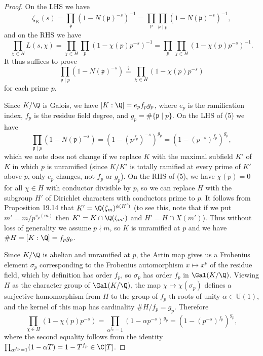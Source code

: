 \begin{proof}
On the LHS we have
\[
\zeta_K(s)=\prod_{\mathfrak p}(1-N(\mathfrak p)^{-s})^{-1}
=\prod_p\prod_{\mathfrak p\mid p}(1-N(\mathfrak p)^{-s})^{-1},
\]
and on the RHS we have
\[
\prod_{\chi\in H}L(s,\chi)=\prod_{\chi\in H}\prod_p(1-\chi(p)p^{-s})^{-1}
=\prod_p\prod_{\chi\in H}(1-\chi(p)p^{-s})^{-1}.
\]
It thus suffices to prove
\[
\prod_{\mathfrak p\mid p}(1-N(\mathfrak p)^{-s})\stackrel{?}{=}\prod_{\chi\in H}(1-\chi(p)p^{-s})\tag{5}
\]
for each prime $p$.

Since $K/\Q$ is Galois, we have $[K:\Q]=e_pf_pg_p$, where $e_p$ is the ramification index, $f_p$ is the residue field degree, and $g_p=\#\{\mathfrak p\mid p\}$. On the LHS of (5) we have
\[
\prod_{\mathfrak p\mid p}(1-N(\mathfrak p)^{-s})=(1-(p^{f_p})^{-s})^{g_p}=(1-(p^{-s})^{f_p})^{g_p},
\]
which we note does not change if we replace $K$ with the maximal subfield $K'$ of $K$ in which $p$ is unramified (since $K/K'$ is totally ramified at every prime of $K'$ above $p$, only $e_p$ changes, not $f_p$ or $g_p$). On the RHS of (5), we have $\chi(p)=0$ for all $\chi\in H$ with conductor divisible by $p$, so we can replace $H$ with the subgroup $H'$ of Dirichlet characters with conductors prime to $p$. It follows from Proposition 19.14 that $K'=\Q(\zeta_m)^{\phi(H')}$ (to see this, note that if we put $m'=m/p^{v_p(m)}$ then $K'=K\cap\Q(\zeta_{m'})$ and $H'=H\cap X(m')$). Thus without loss of generality we assume $p\nmid m$, so $K$ is unramified at $p$ and we have $\#H=[K:\Q]=f_pg_p$.

Since $K/\Q$ is abelian and unramified at $p$, the Artin map gives us a Frobenius element $\sigma_p$ corresponding to the Frobenius automorphism $x\mapsto x^p$ of the residue field, which by definition has order $f_p$, so $\sigma_p$ has order $f_p$ in $\Gal(K/\Q)$. Viewing $H$ as the character group of $\Gal(K/\Q)$, the map $\chi\mapsto\chi(\sigma_p)$ defines a surjective homomorphism from $H$ to the group of $f_p$-th roots of unity $\alpha\in\mathrm U(1)$, and the kernel of this map has cardinality $\#H/f_p=g_p$. Therefore
\[
\prod_{\chi\in H}(1-\chi(p)p^{-s})=\prod_{\alpha^{f_p}=1}(1-\alpha p^{-s})^{g_p}=(1-(p^{-s})^{f_p})^{g_p},
\]
where the second equality follows from the identity $\prod_{\alpha^{f_p}=1}(1-\alpha T)=1-T^{f_p}\in\C[T]$.
\end{proof}
